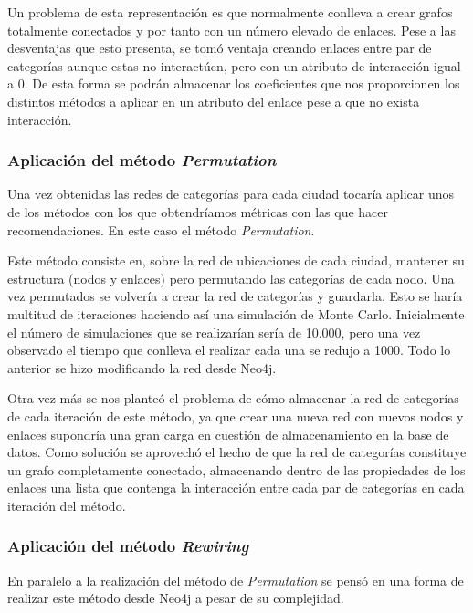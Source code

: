 
Un problema de esta representación es que normalmente conlleva a crear grafos totalmente conectados y por tanto con un número elevado de enlaces. Pese a las desventajas que esto presenta, se tomó ventaja creando enlaces entre par de categorías aunque estas no interactúen, pero con un atributo de interacción igual a 0. De esta forma se podrán almacenar los coeficientes que nos proporcionen los distintos métodos a aplicar en un atributo del enlace pese a que no exista interacción.

\subsubsection{Aplicación del método \textit{Permutation}}
Una vez obtenidas las redes de categorías para cada ciudad tocaría aplicar unos de los métodos con los que obtendríamos métricas con las que hacer recomendaciones. En este caso el método \textit{Permutation}.

Este método consiste en, sobre la red de ubicaciones de cada ciudad, mantener su estructura (nodos y enlaces) pero permutando las categorías de cada nodo. Una vez permutados se volvería a crear la red de categorías y guardarla. Esto se haría multitud de iteraciones haciendo así una simulación de Monte Carlo. Inicialmente el número de simulaciones que se realizarían sería de 10.000, pero una vez observado el tiempo que conlleva el realizar cada una se redujo a 1000. Todo lo anterior se hizo modificando la red desde Neo4j.

Otra vez más se nos planteó el problema de cómo almacenar la red de categorías de cada iteración de este método, ya que crear una nueva red con nuevos nodos y enlaces supondría una gran carga en cuestión de almacenamiento en la base de datos. Como solución se aprovechó el hecho de que la red de categorías constituye un grafo completamente conectado, almacenando dentro de las propiedades de los enlaces una lista que contenga la interacción entre cada par de categorías en cada iteración del método.



\subsubsection{Aplicación del método \textit{Rewiring}}
En paralelo a la realización del método de \textit{Permutation} se pensó en una forma de realizar este método desde Neo4j a pesar de su complejidad.

